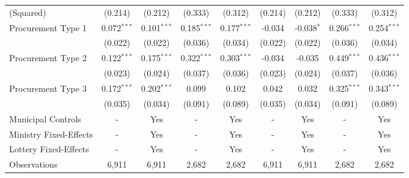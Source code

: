 \begin{table}[!htbp]
\begin{tabular}{l@{\extracolsep{4pt}}cccc@{\extracolsep{4pt}}cccc}
  (Squared)                      & (0.214)        & (0.212)        & (0.333)        & (0.312)        & (0.214)        & (0.212)        & (0.333)        & (0.312)        \T \B \\
  Procurement Type 1             & 0.072$^{***}$  & 0.101$^{***}$  & 0.185$^{***}$  & 0.177$^{***}$  & -0.034         & -0.038$^{*}$   & 0.266$^{***}$  & 0.254$^{***}$  \T \B \\
                                 & (0.022)        & (0.022)        & (0.036)        & (0.034)        & (0.022)        & (0.022)        & (0.036)        & (0.034)        \T \B \\
  Procurement Type 2             & 0.122$^{***}$  & 0.175$^{***}$  & 0.322$^{***}$  & 0.303$^{***}$  & -0.034         & -0.035         & 0.449$^{***}$  & 0.436$^{***}$  \T \B \\
                                 & (0.023)        & (0.024)        & (0.037)        & (0.036)        & (0.023)        & (0.024)        & (0.037)        & (0.036)        \T \B \\
  Procurement Type 3             & 0.172$^{***}$  & 0.202$^{***}$  & 0.099          & 0.102          & 0.042          & 0.032          & 0.325$^{***}$  & 0.343$^{***}$  \T \B \\
                                 & (0.035)        & (0.034)        & (0.091)        & (0.089)        & (0.035)        & (0.034)        & (0.091)        & (0.089)        \T \B \\
  \hline
  Municipal Controls     & \multicolumn{1}{c}{-} & \multicolumn{1}{c}{Yes} & \multicolumn{1}{c}{-} & \multicolumn{1}{c}{Yes} & \multicolumn{1}{c}{-} & \multicolumn{1}{c}{Yes} & \multicolumn{1}{c}{-} & \multicolumn{1}{c}{Yes} \T \B \\
  Ministry Fixed-Effects & \multicolumn{1}{c}{-} & \multicolumn{1}{c}{Yes} & \multicolumn{1}{c}{-} & \multicolumn{1}{c}{Yes} & \multicolumn{1}{c}{-} & \multicolumn{1}{c}{Yes} & \multicolumn{1}{c}{-} & \multicolumn{1}{c}{Yes} \T \B \\
  Lottery Fixed-Effects  & \multicolumn{1}{c}{-} & \multicolumn{1}{c}{Yes} & \multicolumn{1}{c}{-} & \multicolumn{1}{c}{Yes} & \multicolumn{1}{c}{-} & \multicolumn{1}{c}{Yes} & \multicolumn{1}{c}{-} & \multicolumn{1}{c}{Yes} \T \B \\
  \hline
  Observations     & \multicolumn{1}{c}{6,911}          & \multicolumn{1}{c}{6,911}          & \multicolumn{1}{c}{2,682}          & \multicolumn{1}{c}{2,682}         & \multicolumn{1}{c}{6,911}          & \multicolumn{1}{c}{6,911}          & \multicolumn{1}{c}{2,682}          & \multicolumn{1}{c}{2,682}          \T \B \\

\end{tabular}
\end{table}
